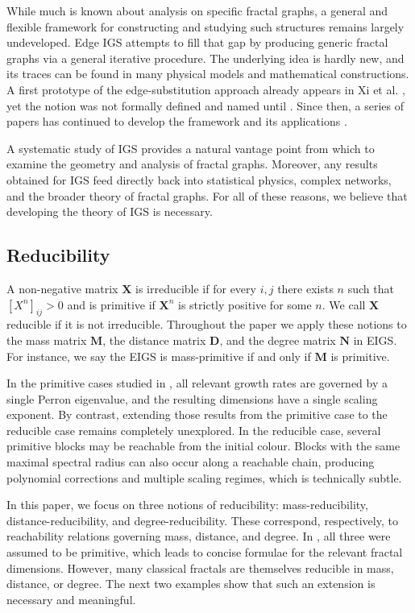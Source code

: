 \documentclass[12pt]{iopart}
\begin{document}
\medskip

While much is known about analysis on specific fractal graphs, a general and flexible framework for constructing and studying such structures remains largely undeveloped.  
Edge IGS attempts to fill that gap by producing generic fractal graphs via a general iterative procedure.
The underlying idea is hardly new, and its traces can be found in many physical models and mathematical constructions.  
A first prototype of the edge-substitution approach already appears in Xi et al. \cite{xi2017fractality,ye2019average}, yet the notion was not formally defined and named until \cite{neroli2024fractal}.  
Since then, a series of papers has continued to develop the framework and its applications \cite{li2018scale,anttila2024constructions,anttila2024iterated,li2025fractal}.

A systematic study of IGS provides a natural vantage point 
from which to examine the geometry and analysis of fractal graphs.  
Moreover, any results obtained for IGS feed directly back into 
statistical physics, complex networks, and the broader theory of fractal graphs.  
For all of these reasons, we believe that developing the theory of IGS is necessary.  


\subsection{Reducibility}


{ 

A non-negative matrix $\mathbf X$ is irreducible if for every $i,j$ there exists $n$ such that $[X^{n}]_{ij} > 0$ and is primitive if $\mathbf X^{n}$ is strictly positive for some $n$. 
We call $\mathbf X$ reducible if it is not irreducible. 
Throughout the paper we apply these notions to the mass matrix $\mathbf M$, the distance matrix $\mathbf D$, and the degree matrix $\mathbf N$ in EIGS. 
For instance, we say the EIGS is mass-primitive if and only if $\mathbf M$ is primitive.


In the primitive cases studied in \cite{li2024scale,neroli2024fractal}, all relevant growth rates are governed by a single Perron eigenvalue, and the resulting dimensions have a single scaling exponent. 
By contrast, extending those results from the primitive case to the reducible case remains completely unexplored.
In the reducible case, several primitive blocks may be reachable from the initial colour. 
Blocks with the same maximal spectral radius can also occur along a reachable chain, producing polynomial corrections and multiple scaling regimes, which is technically subtle.



In this paper, we focus on three notions of reducibility: mass-reducibility, distance-reducibility, and degree-reducibility.
These correspond, respectively, to reachability relations governing mass, distance, and degree.
In \cite{li2024scale,neroli2024fractal}, all three were assumed to be primitive, which leads to concise formulae for the relevant fractal dimensions.
However, many classical fractals are themselves reducible in mass, distance, or degree.
The next two examples show that such
an extension is necessary and meaningful.
}
\end{document}
